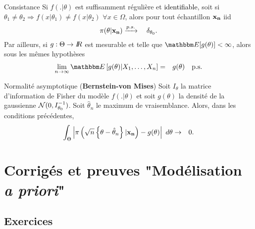 \documentclass[10pt]{article}
\begin{document}
 
\fi


\if{}

\begin{theorem}{Consistance}\label{consistance.post}
Si $f(.|\theta)$ est suffisamment régulière et \textcolor{black}{identifiable}, soit si $\theta_1\neq\theta_2 \Rightarrow f(x|\theta_1)\neq f(x|\theta_2)$ $\forall x\in\Omega$, alors pour tout échantillon $\bf x_n$ iid
\begin{eqnarray*}
\pi(\theta|{\bf x_n}) & \xrightarrow{p.s.}{} & \delta_{\theta_0}.
\end{eqnarray*}
Par ailleurs, si $g:\Theta\to I\!\!R$ est mesurable et telle que $\E[g(\theta)]<\infty$, alors sous les mêmes hypothèses
\begin{eqnarray*}
\lim\limits_{n\to\infty} \E\left[g(\theta)|X_1,\ldots,X_n\right] & = & g(\theta) \ \ \ \text{p.s.}
\end{eqnarray*}
\end{theorem}

 



\begin{theorem}{Normalité asymptotique (\textbf{Bernstein-von Mises})}\label{von.mises}
Soit $I_{\theta}$ la matrice d'information de Fisher du modèle $f(.|\theta)$ et soit $g(\theta)$ la densité de la gaussienne ${\cal{N}}(0,I^{-1}_{\theta_0})$. Soit $\hat{\theta}_n$ le maximum de vraisemblance. Alors, dans les conditions précédentes,
\begin{eqnarray*}
\int_{\Theta}\left|\pi\left(\sqrt{n}\left\{\theta - \hat{\theta}_n\right\}|{\bf x_n}\right) - g(\theta)\right| \ d\theta & \rightarrow & 0.
\end{eqnarray*}
\end{theorem}

 
\fi




\clearpage
\section{Corrigés et preuves "Modélisation {\it a priori}"}


\subsection{Exercices}
\end{document}
